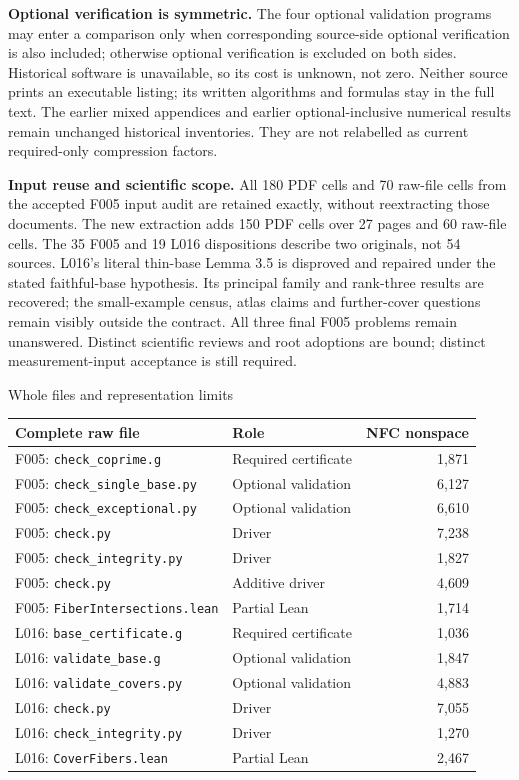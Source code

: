 \documentclass[a4paper,11pt]{article}
\begin{document}
\textbf{Optional verification is symmetric.} The four optional validation
programs may enter a comparison only when corresponding source-side optional
verification is also included; otherwise optional verification is excluded on
both sides. Historical software is unavailable, so its cost is unknown, not
zero. Neither source prints an executable listing; its written algorithms and
formulas stay in the full text. The earlier mixed appendices and earlier optional-inclusive numerical
results remain unchanged historical inventories. They are not relabelled as
current required-only compression factors.

\textbf{Input reuse and scientific scope.} All 180 PDF cells and 70 raw-file
cells from the accepted F005 input audit are retained exactly, without
reextracting those documents. The new extraction adds 150 PDF cells over
27 pages and 60 raw-file cells. The 35 F005 and 19 L016 dispositions describe
two originals, not 54 sources. L016's literal thin-base Lemma 3.5 is disproved
and repaired under the stated faithful-base hypothesis. Its principal family
and rank-three results are recovered; the small-example census, atlas claims
and further-cover questions remain visibly outside the contract. All three
final F005 problems remain unanswered. Distinct scientific reviews and root
adoptions are bound; distinct measurement-input acceptance is still required.

\newpage
\begin{center}{\large Whole files and representation limits}\end{center}
\begin{center}\small
\begin{tabular}{@{}p{92mm}p{42mm}r@{}}\toprule
Complete raw file & Role & NFC nonspace\\\midrule
F005: \texttt{check\_coprime.g} & Required certificate & 1,871 \\
F005: \texttt{check\_single\_base.py} & Optional validation & 6,127 \\
F005: \texttt{check\_exceptional.py} & Optional validation & 6,610 \\
F005: \texttt{check.py} & Driver & 7,238 \\
F005: \texttt{check\_integrity.py} & Driver & 1,827 \\
F005: \texttt{check.py} & Additive driver & 4,609 \\
F005: \texttt{FiberIntersections.lean} & Partial Lean & 1,714 \\
L016: \texttt{base\_certificate.g} & Required certificate & 1,036 \\
L016: \texttt{validate\_base.g} & Optional validation & 1,847 \\
L016: \texttt{validate\_covers.py} & Optional validation & 4,883 \\
L016: \texttt{check.py} & Driver & 7,055 \\
L016: \texttt{check\_integrity.py} & Driver & 1,270 \\
L016: \texttt{CoverFibers.lean} & Partial Lean & 2,467 \\
\bottomrule\end{tabular}\end{center}
\end{document}
